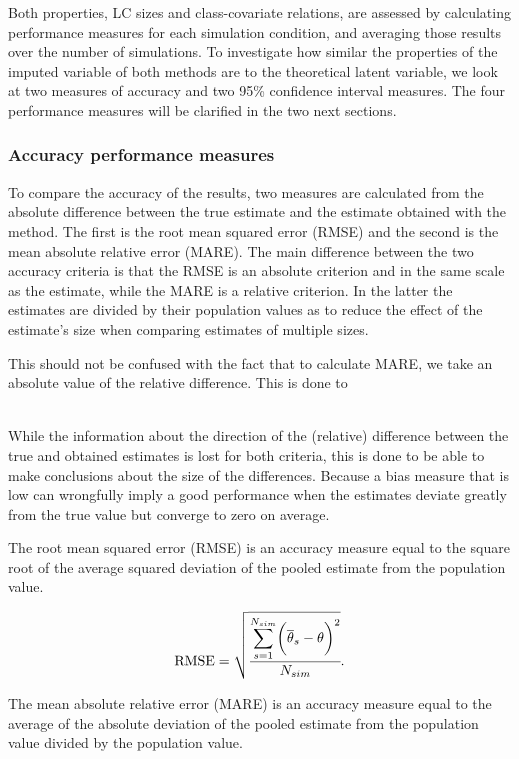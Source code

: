 \documentclass[a4paper, 11pt]{article} %
\begin{document}
Both properties, LC sizes and class-covariate relations, are assessed by calculating performance measures for each simulation condition, and averaging those results over the number of simulations. To investigate how similar the properties of the imputed variable of both methods are to the theoretical latent variable, we look at two measures of accuracy and two 95\% confidence interval measures. The four performance measures will be clarified in the two next sections.

\subsubsection{Accuracy performance measures}
To compare the accuracy of the results, two measures are calculated from the absolute difference between the true estimate and the estimate obtained with the method. The first is the root mean squared error (RMSE) and the second is the mean absolute relative error (MARE). The main difference between the two accuracy criteria is that the RMSE is an absolute criterion and in the same scale as the estimate, while the MARE is a relative criterion. In the latter the estimates are divided by their population values as to reduce the effect of the estimate's size when comparing estimates of multiple sizes. 

This should not be confused with the fact that to calculate MARE, we take an absolute value of the relative difference. This is done to 

\\While the information about the direction of the (relative) difference between the true and obtained estimates is lost for both criteria, this is done to be able to make conclusions about the size of the differences. Because a bias measure that is low can wrongfully imply a good performance when the estimates deviate greatly from the true value but converge to zero on average.

The root mean squared error (RMSE) is an accuracy measure equal to the square root of the average squared deviation of the pooled estimate from the population value.

\begin{equation}
    {\text{RMSE}}=\sqrt{\cfrac{\mathlarger\sum_{s=1}^{N_{sim}}
    \bigg(\overline{\theta}_s-\theta\bigg)^2}
    {N_{sim}}} .
\end{equation}	

The mean absolute relative error (MARE) is an accuracy measure equal to the average of the
absolute deviation of the pooled estimate from the population value divided by the population value.
\end{document}
